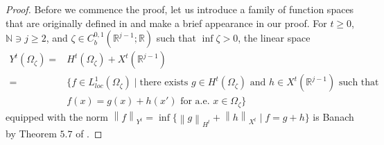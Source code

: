 \documentclass[11pt,letterpaper,reqno]{amsart}
\numberwithin{equation}{section}
\newcommand{\norm}[1]{\left\lVert#1\right\rVert}
\begin{document}
\begin{proof}
    Before we commence the proof, let us introduce a family of function spaces that are originally defined in \cite{leoni2023traveling} and make a brief appearance in our proof. For \(t \geq 0\), \(\mathbb{N} \ni j \geq 2\), and \(\zeta \in C_{b}^{0,1}(\mathbb{R}^{j-1};\mathbb{R})\) such that \(\inf \zeta>0\), the linear space
    \begin{align}
        Y^{t}(\Omega_{\zeta})=&H^{t}(\Omega_{\zeta})+X^{t}(\mathbb{R}^{j-1}) \nonumber\\
        =&\{f \in L^{1}_{loc}(\Omega_{\zeta}) \mid \mbox{there exists \(g \in H^{t}(\Omega_{\zeta})\) and \(h \in X^{t}(\mathbb{R}^{j-1})\) such that} \nonumber\\
        &\mbox{\(f(x)=g(x)+h(x')\) for a.e. \(x \in \Omega_{\zeta}\)}\}
    \end{align}
    equipped with the norm \(\norm{f}_{Y^{t}}=\inf\{\norm{g}_{H^{t}}+\norm{h}_{X^{t}} \mid f=g+h\}\) is Banach by Theorem \(5.7\) of \cite{leoni2023traveling}. 


\end{proof}
\end{document}
